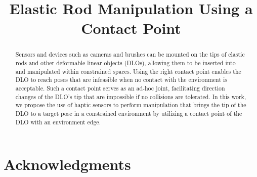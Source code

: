 \documentclass[conference]{IEEEtran}
\newcommand*{\paperid}{[add your ID here]} %
\newcommand*{\papertitle}{Elastic Rod Manipulation Using a Contact Point}
\newif\ifanonymous
\newif\ifshownotes
\DeclareRobustCommand{\draftnote}[3]{%
  \ifshownotes\textcolor{#1}{[\textbf{#2:} #3]}\else\ifhmode\unskip\fi\fi}
\newcommand{\todo}[1]{\draftnote{notecolor}{TODO}{#1}}
\begin{document}
\title{\papertitle}

\ifanonymous
  \author{Author Names Omitted for Anonymous Review. Paper-ID \paperid}
\else
  \author{
  }
\fi

\maketitle

\begin{abstract}
Sensors and devices such as cameras and brushes can be mounted on the tips of
elastic rods and other deformable linear objects (DLOs), allowing them to be
inserted into and manipulated within constrained spaces. Using the right
contact point enables the DLO to reach poses that are infeasible when no
contact with the environment is acceptable. Such a contact point serves as an
ad-hoc joint, facilitating direction changes of the DLO's tip that are
impossible if no collisions are tolerated. In this work, we propose the use of
haptic sensors to perform manipulation that brings the tip of the DLO to a
target pose in a constrained environment by utilizing a contact point of the
DLO with an environment edge.
\todo{Add 1--2 sentences on the hypotheses and methodology (vision-free tip-pose
estimation from gripper pose, wrist force/torque, and contact location;
contact-aware steering) and on the preliminary results.}
\end{abstract}

\IEEEpeerreviewmaketitle









\ifanonymous\else
\section*{Acknowledgments}
\todo{Funding and acknowledgments (camera-ready only).}
\fi



\end{document}
